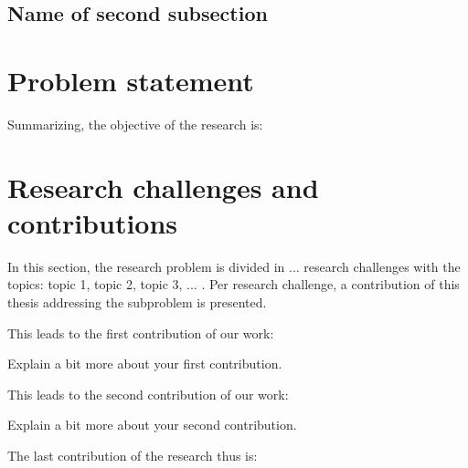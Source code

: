 \lipsum[19-23]



\subsection{Name of second subsection}\label{subsec: chap1 background3}

\lipsum[1-5]

\section{Problem statement}\label{sec: chap1 prob statement}

\lipsum[6-8]
Summarizing, the objective of the research is:
\vspace*{3mm}


\section{Research challenges and contributions}\label{sec: chap1 contributions}
In this section, the research problem is divided in ... research challenges with the topics: topic 1, topic 2, topic 3, ... . Per research challenge, a contribution of this thesis addressing the subproblem is presented.


\lipsum[1-2] This leads to the first contribution of our work:


Explain a bit more about your first contribution.


\lipsum[4-5] This leads to the second contribution of our work:


Explain a bit more about your second contribution.


\lipsum[1-2] The last contribution of the research thus is:



